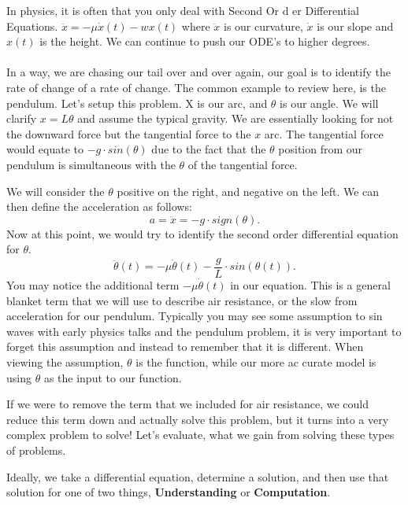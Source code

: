 \documentclass[10pt, oneside]{report}
\begin{document}
In physics, it is often that you only deal with Second Or d er Differential Equations. $\ddot{x} = -\mu\dot{x}(t) - wx(t)$ where $\ddot{x}$ is our curvature, $\dot{x}$ is our slope and $x(t)$ is the height. We can continue to push our ODE's to higher degrees. 
\\
\\
In a way, we are chasing our tail over and over again, our goal is to identify the rate of change of a rate of change.  The common example to review here, is the pendulum.  Let's setup this problem.  X is our arc, and $\theta$ is our angle.  We will clarify $x = L\theta$ and assume the typical gravity.  We are essentially looking for not the downward force but the tangential force to the $x$ arc. The tangential force would equate to $-g\cdot sin(\theta)$ due to the fact that the $\theta$ position from our pendulum is simultaneous with the $\theta$ of the tangential force.

We will consider the $\theta$ positive on the right, and negative on the left.  We can then define the acceleration as follows:
\[
    a = \ddot{x} = -g \cdot sign(\theta)
.\] 
Now at this point, we would try to identify the second order differential equation for $\theta$. 
\[
    \ddot{\theta}(t) = -\mu\dot{\theta}(t) - \frac{g}{L} \cdot sin(\theta(t))
.\] 
You may notice the additional term $-\mu\dot{\theta}(t)$ in our equation.  This is a general blanket term that we will use to describe air resistance, or the slow from acceleration for our pendulum.  Typically you may see some assumption to sin waves with early physics talks and the pendulum problem, it is very important to forget this assumption and instead to remember that it is different.  When viewing the assumption, $\theta$ is the function, while our more ac curate model is using $\theta$ as the input to our function.  

If we were to remove the term that we included for air resistance, we could reduce this term down and actually solve this problem, but it turns into a very complex problem to solve! Let's evaluate, what we gain from solving these types of problems.

Ideally, we take a differential equation, determine a solution, and then use that solution for one of two things, \textbf{Understanding} or \textbf{Computation}.
\end{document}
